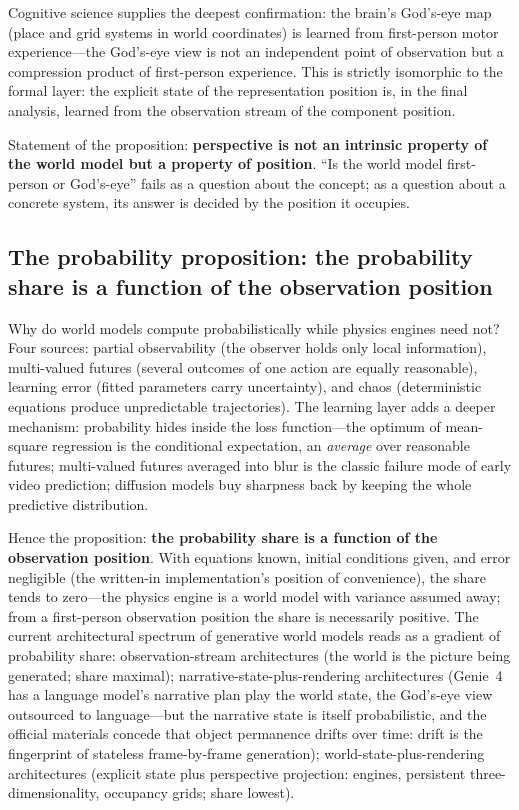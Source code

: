 \documentclass[10pt]{article}
\begin{document}
Cognitive science supplies the deepest confirmation: the brain's God's-eye map (place and grid systems in world coordinates) is learned from first-person motor experience\cite{tolman1948,okeefe1978}---the God's-eye view is not an independent point of observation but a compression product of first-person experience. This is strictly isomorphic to the formal layer: the explicit state of the representation position is, in the final analysis, learned from the observation stream of the component position.

Statement of the proposition: \textbf{perspective is not an intrinsic property of the world model but a property of position}. ``Is the world model first-person or God's-eye'' fails as a question about the concept; as a question about a concrete system, its answer is decided by the position it occupies.

\subsection{The probability proposition: the probability share is a function of the observation position}\label{sec:probability}

Why do world models compute probabilistically while physics engines need not? Four sources: partial observability (the observer holds only local information), multi-valued futures (several outcomes of one action are equally reasonable), learning error (fitted parameters carry uncertainty), and chaos (deterministic equations produce unpredictable trajectories\cite{lorenz1963}). The learning layer adds a deeper mechanism: probability hides inside the loss function---the optimum of mean-square regression is the conditional expectation, an \emph{average} over reasonable futures; multi-valued futures averaged into blur is the classic failure mode of early video prediction\cite{mathieu2016video}; diffusion models buy sharpness back by keeping the whole predictive distribution\cite{ho2020ddpm}.

Hence the proposition: \textbf{the probability share is a function of the observation position}. With equations known, initial conditions given, and error negligible (the written-in implementation's position of convenience), the share tends to zero---the physics engine is a world model with variance assumed away; from a first-person observation position the share is necessarily positive. The current architectural spectrum of generative world models reads as a gradient of probability share: observation-stream architectures (the world is the picture being generated; share maximal); narrative-state-plus-rendering architectures (Genie~4 has a language model's narrative plan play the world state, the God's-eye view outsourced to language---but the narrative state is itself probabilistic, and the official materials concede that object permanence drifts over time: drift is the fingerprint of stateless frame-by-frame generation\cite{deepmind2026genie4}); world-state-plus-rendering architectures (explicit state plus perspective projection: engines, persistent three-dimensionality, occupancy grids; share lowest).
\end{document}
